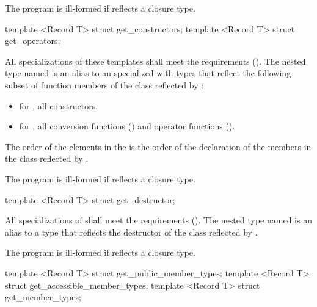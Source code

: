 \begin{std.txt}
\begin{itemdescr}
\pnum
\remarks
The program is ill-formed if  reflects a closure type.

\end{itemdescr}

\begin{itemdecl}
template <Record T> struct get_constructors;
template <Record T> struct get_operators;
\end{itemdecl}
\begin{itemdescr}
\pnum
All specializations of these templates shall meet the  requirements (). The nested type named  is an alias to an  specialized with  types that reflect the following subset of function members of the class reflected by :
\begin{itemize}
   \item for , all constructors.
   \item for , all conversion functions () and operator functions ().
\end{itemize}

\pnum
The order of the elements in the  is the order of the declaration of the members in the class reflected by .

\pnum
\remarks
The program is ill-formed if  reflects a closure type.
\end{itemdescr}

\begin{itemdecl}
template <Record T> struct get_destructor;
\end{itemdecl}
\begin{itemdescr}
\pnum
All specializations of  shall meet the  requirements (). The nested type named  is an alias to a  type that reflects the destructor of the class reflected by .

\pnum
\remarks
The program is ill-formed if  reflects a closure type.
\end{itemdescr}

\begin{itemdecl}
template <Record T> struct get_public_member_types;
template <Record T> struct get_accessible_member_types;
template <Record T> struct get_member_types;
\end{itemdecl}


\end{std.txt}
